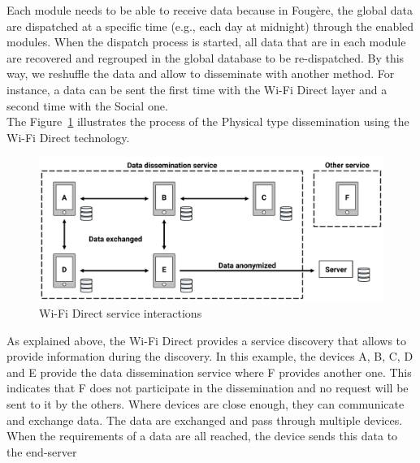 Each module needs to be able to receive data because in Foug\`ere, the global data are dispatched at a specific time (e.g., each day at midnight) through the enabled modules.
When the dispatch process is started, all data that are in each module are recovered and regrouped in the global database to be re-dispatched.
By this way, we reshuffle the data and allow to disseminate with another method.
For instance, a data can be sent the first time with the Wi-Fi Direct layer and a second time with the Social one.
\\

The Figure~\ref{WiFiDiServInt} illustrates the process of the Physical type dissemination using the Wi-Fi Direct technology.

\begin{figure}[h]
	\centering
	\includegraphics[width=\textwidth]{figures/wifidirect}
	\caption{\label{WiFiDiServInt} Wi-Fi Direct service interactions}
\end{figure}

As explained above, the Wi-Fi Direct provides a service discovery that allows to provide information during the discovery. 
In this example, the devices A, B, C, D and E provide the data dissemination service where F provides another one.
This indicates that F does not participate in the dissemination and no request will be sent to it by the others.
Where devices are close enough, they can communicate and exchange data.
The data are exchanged and pass through multiple devices.
When the requirements of a data are all reached, the device sends this data to the end-server 

